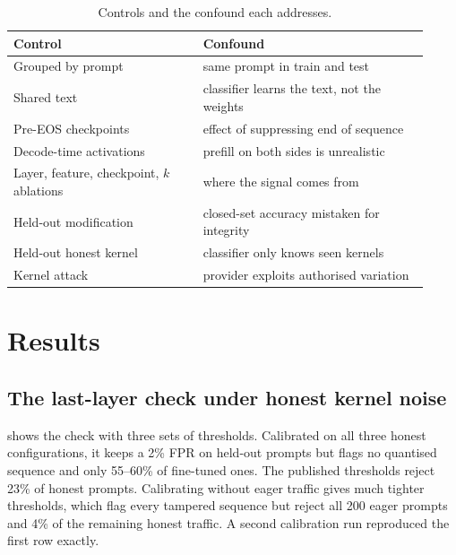 \documentclass[10pt,twocolumn]{article}
\begin{document}
\begin{table}[!htb]
\centering
\small
\caption{Controls and the confound each addresses.}
\label{tab:controls}
\begin{tabular}{@{}>{\raggedright\arraybackslash}p{0.42\linewidth}>{\raggedright\arraybackslash}p{0.5\linewidth}@{}}
\toprule
Control & Confound \\
\midrule
Grouped by prompt & same prompt in train and test \\
Shared text & classifier learns the text, not the weights \\
Pre-EOS checkpoints & effect of suppressing end of sequence \\
Decode-time activations & prefill on both sides is unrealistic \\
Layer, feature, checkpoint, $k$ ablations & where the signal comes from \\
Held-out modification & closed-set accuracy mistaken for integrity \\
Held-out honest kernel & classifier only knows seen kernels \\
Kernel attack & provider exploits authorised variation \\
\bottomrule
\end{tabular}
\end{table}

\section{Results}
\label{sec:results}

\subsection{The last-layer check under honest kernel noise}
\label{sec:res-baseline}

 shows the check with three sets of thresholds.
Calibrated on all three honest configurations, it keeps a 2\% FPR on held-out prompts but flags no quantised sequence and only 55--60\% of fine-tuned ones.
The published thresholds reject 23\% of honest prompts.
Calibrating without eager traffic gives much tighter thresholds, which flag every tampered sequence but reject all 200 eager prompts and 4\% of the remaining honest traffic.
A second calibration run reproduced the first row exactly.
\end{document}

